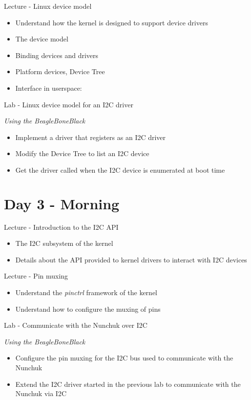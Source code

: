 \documentclass[a4paper,12pt,obeyspaces,spaces,hyphens]{article}
\begin{document}
\feagendatwocolumn
{Lecture - Linux device model}
{
  \begin{itemize}
  \item Understand how the kernel is designed to support device
    drivers
  \item The device model
  \item Binding devices and drivers
  \item Platform devices, Device Tree
  \item Interface in userspace: 
  \end{itemize}
}
{Lab - Linux device model for an I2C driver}
{
  {\em Using the BeagleBoneBlack}
  \begin{itemize}
  \item Implement a driver that registers as an I2C driver
  \item Modify the Device Tree to list an I2C device
  \item Get the driver called when the I2C device is enumerated at
    boot time
  \end{itemize}
}

\section{Day 3 - Morning}

\feagendatwocolumn
{Lecture - Introduction to the I2C API}
{
  \begin{itemize}
  \item The I2C subsystem of the kernel
  \item Details about the API provided to kernel drivers to interact
    with I2C devices
  \end{itemize}
}
{Lecture - Pin muxing}
{
  \begin{itemize}
  \item Understand the {\em pinctrl} framework of the kernel
  \item Understand how to configure the muxing of pins
  \end{itemize}
}

\feagendaonecolumn
{Lab - Communicate with the Nunchuk over I2C}
{
  {\em Using the BeagleBoneBlack}
  \begin{itemize}
  \item Configure the pin muxing for the I2C bus used to communicate
    with the Nunchuk
  \item Extend the I2C driver started in the previous lab to
    communicate with the Nunchuk via I2C
  \end{itemize}
}
\end{document}
